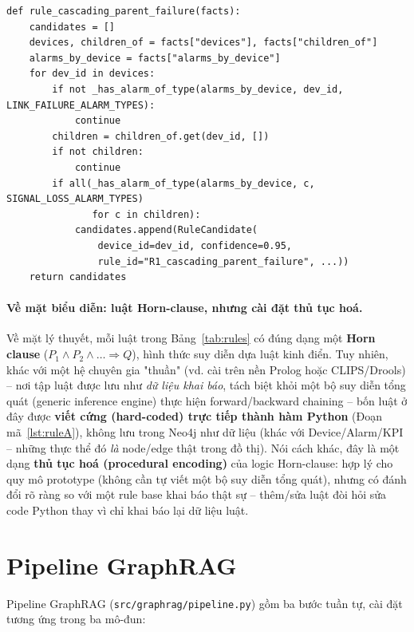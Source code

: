 \documentclass[12pt,a4paper]{report}
\newcommand{\code}[1]{\texttt{\small #1}}
\begin{document}
\begin{lstlisting}[style=py,caption={Luật R1 -- cascading parent failure (\texttt{src/rules/rule\_engine.py})},label=lst:ruleA]
def rule_cascading_parent_failure(facts):
    candidates = []
    devices, children_of = facts["devices"], facts["children_of"]
    alarms_by_device = facts["alarms_by_device"]
    for dev_id in devices:
        if not _has_alarm_of_type(alarms_by_device, dev_id, LINK_FAILURE_ALARM_TYPES):
            continue
        children = children_of.get(dev_id, [])
        if not children:
            continue
        if all(_has_alarm_of_type(alarms_by_device, c, SIGNAL_LOSS_ALARM_TYPES)
               for c in children):
            candidates.append(RuleCandidate(
                device_id=dev_id, confidence=0.95,
                rule_id="R1_cascading_parent_failure", ...))
    return candidates
\end{lstlisting}

\paragraph{Về mặt biểu diễn: luật Horn-clause, nhưng cài đặt thủ tục hoá.} Về mặt lý thuyết, mỗi luật trong
Bảng~\ref{tab:rules} có đúng dạng một \textbf{Horn clause} (\(P_1 \wedge P_2 \wedge \dots \Rightarrow Q\)),
hình thức suy diễn dựa luật kinh điển. Tuy nhiên, khác với một hệ chuyên gia "thuần" (vd. cài trên nền
Prolog hoặc CLIPS/Drools) -- nơi tập luật được lưu như \emph{dữ liệu khai báo}, tách biệt khỏi một bộ
suy diễn tổng quát (generic inference engine) thực hiện forward/backward chaining -- bốn luật ở đây được
\textbf{viết cứng (hard-coded) trực tiếp thành hàm Python} (Đoạn mã~\ref{lst:ruleA}), không lưu trong
Neo4j như dữ liệu (khác với Device/Alarm/KPI -- những thực thể đó \emph{là} node/edge thật trong đồ thị).
Nói cách khác, đây là một dạng \textbf{thủ tục hoá (procedural encoding)} của logic Horn-clause: hợp lý
cho quy mô prototype (không cần tự viết một bộ suy diễn tổng quát), nhưng có đánh đổi rõ ràng so với một
rule base khai báo thật sự -- thêm/sửa luật đòi hỏi sửa code Python thay vì chỉ khai báo lại dữ liệu luật.

\section{Pipeline GraphRAG}

Pipeline GraphRAG (\code{src/graphrag/pipeline.py}) gồm ba bước tuần tự, cài đặt tương ứng trong ba
mô-đun:
\end{document}
